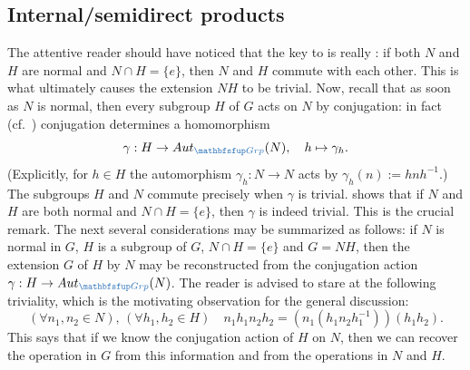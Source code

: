 \subsection{Internal/semidirect products}
\label{subsec:groups2:internal-semidirect-products}
The attentive reader should have noticed that the key to
 is really : if both $N$
and $H$ are normal and $N \cap H = \{e\}$, then $N$ and $H$ commute
with each other. This is what ultimately causes the extension $NH$ to
be trivial. Now, recall that as soon as $N$ is normal, then every
subgroup $H$ of $G$ acts on $N$ by conjugation: in fact (cf.\
) conjugation
determines a homomorphism
\[\gamma : H \to \Aut_{\categ{Grp}}(N), \quad
  h \mapsto \gamma_h.\] (Explicitly, for $h \in H$ the automorphism
$\gamma_h : N \to N$ acts by $\gamma_h(n) := hnh^{-1}$.) The subgroups
$H$ and $N$ commute precisely when $\gamma$ is
trivial.  shows that if $N$ and $H$ are both
normal and $N \cap H = \{e\}$, then $\gamma$ is indeed trivial.  This
is the crucial remark. The next several considerations may be
summarized as follows: if $N$ is normal in $G$, $H$ is a subgroup of
$G$, $N \cap H = \{e\}$ and $G = NH$, then the extension $G$ of $H$ by
$N$ may be reconstructed from the conjugation action
$\gamma : H \to \Aut_{\categ{Grp}}(N)$. The reader is advised to stare
at the following triviality, which is the motivating observation for
the general discussion:
\begin{equation}
  \tag{*}
  (\forall n_1, n_2 \in N),\, (\forall h_1, h_2 \in H) \quad
  n_1 h_1 n_2 h_2 = (n_1(h_1 n_2 h_1^{-1}))(h_1 h_2).
\end{equation}
This says that if we know the conjugation action of $H$ on $N$, then
we can recover the operation in $G$ from this information and from the
operations in $N$ and $H$.

